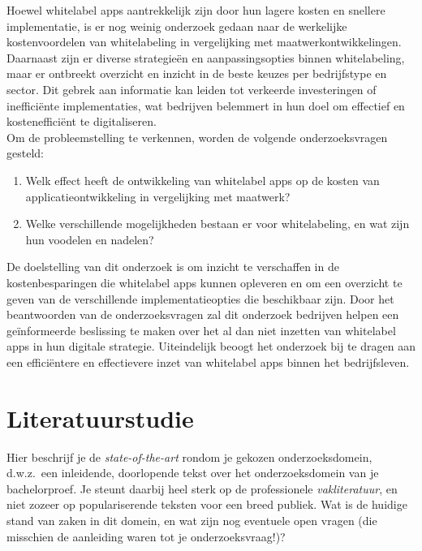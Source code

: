 Hoewel whitelabel apps aantrekkelijk zijn door hun lagere kosten en snellere implementatie, is er nog weinig onderzoek gedaan naar de werkelijke kostenvoordelen van whitelabeling in vergelijking met maatwerkontwikkelingen. 
Daarnaast zijn er diverse strategieën en aanpassingsopties binnen whitelabeling, maar er ontbreekt overzicht en inzicht in de beste keuzes per bedrijfstype en sector. 
Dit gebrek aan informatie kan leiden tot verkeerde investeringen of inefficiënte implementaties, wat bedrijven belemmert in hun doel om effectief en kostenefficiënt te digitaliseren.\\

Om de probleemstelling te verkennen, worden de volgende onderzoeksvragen gesteld:
\begin{enumerate}
  \item Welk effect heeft de ontwikkeling van whitelabel apps op de kosten van applicatieontwikkeling in vergelijking met maatwerk?
  \item Welke verschillende mogelijkheden bestaan er voor whitelabeling, en wat zijn hun voodelen en nadelen?
\end{enumerate}

De doelstelling van dit onderzoek is om inzicht te verschaffen in de kostenbesparingen die whitelabel apps kunnen opleveren en om een overzicht te geven van de verschillende implementatieopties die beschikbaar zijn. 
Door het beantwoorden van de onderzoeksvragen zal dit onderzoek bedrijven helpen een geïnformeerde beslissing te maken over het al dan niet inzetten van whitelabel apps in hun digitale strategie. 
Uiteindelijk beoogt het onderzoek bij te dragen aan een efficiëntere en effectievere inzet van whitelabel apps binnen het bedrijfsleven.


\section{Literatuurstudie}%
\label{sec:literatuurstudie}

Hier beschrijf je de \emph{state-of-the-art} rondom je gekozen onderzoeksdomein, d.w.z.\ een inleidende, doorlopende tekst over het onderzoeksdomein van je bachelorproef. Je steunt daarbij heel sterk op de professionele \emph{vakliteratuur}, en niet zozeer op populariserende teksten voor een breed publiek. Wat is de huidige stand van zaken in dit domein, en wat zijn nog eventuele open vragen (die misschien de aanleiding waren tot je onderzoeksvraag!)?

